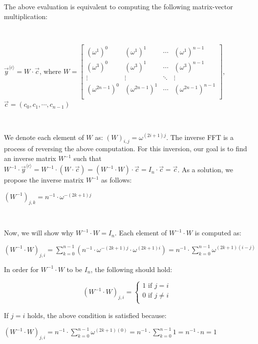 The above evaluation is equivalent to computing the following matrix-vector multiplication: 

$ $



$\vec y^{\langle c \rangle} = W \cdot \vec{c}$, \text{ } where $W = \begin{bmatrix}
(\omega^1)^0 & (\omega^1)^1 & \cdots & (\omega^1)^{n-1}\\
(\omega^3)^0 & (\omega^3)^1 & \cdots & (\omega^3)^{n-1}\\
\vdots & \vdots & \ddots & \vdots \\
(\omega^{2n-1})^0 & (\omega^{2n-1})^1 & \cdots & (\omega^{2n-1})^{n-1}\\
\end{bmatrix} $, \text{ } $\vec{c} = (c_0, c_1, \cdots, c_{n-1})$

$ $

We denote each element of $W$ as: $(W)_{i,j} = \omega^{(2i+1)j}$. The inverse FFT is a process of reversing the above computation. For this inversion, our goal is to find an inverse matrix $W^{-1}$ such that $W^{-1} \cdot \vec y^{\langle c \rangle} = W^{-1} \cdot (W \cdot \vec{c}) = (W^{-1} \cdot W) \cdot \vec{c} = I_n \cdot \vec{c} =  \vec{c}$.
As a solution, we propose the inverse matrix $W^{-1}$ as follows: 

$(W^{-1})_{j,k} = n^{-1}\cdot \omega^{-(2k+1)j}$

$ $

Now, we will show why $W^{-1} \cdot W = I_n$. Each element of $W^{-1} \cdot W$ is computed as: 

$(W^{-1} \cdot W)_{j, i} = \sum\limits_{k=0}^{n-1}(n^{-1}\cdot \omega^{-(2k+1)j} \cdot \omega^{(2k+1)i}) = n^{-1}\cdot\sum\limits_{k=0}^{n-1}\omega^{(2k+1)(i-j)}$

In order for $W^{-1} \cdot W$ to be $I_n$, the following should hold:

\[
(W^{-1} \cdot W)_{j, i} = \begin{cases}
\text{1 if } j = i \\
\text{0 if } j \neq i \\
\end{cases}
\]

If $j = i$ holds, the above condition is satisfied because: 

$(W^{-1} \cdot W)_{j, i} = n^{-1}\cdot\sum\limits_{k=0}^{n-1}\omega^{(2k+1)(0)} =  n^{-1}\cdot\sum\limits_{k=0}^{n-1}1 = n^{-1} \cdot n = 1$

$ $

